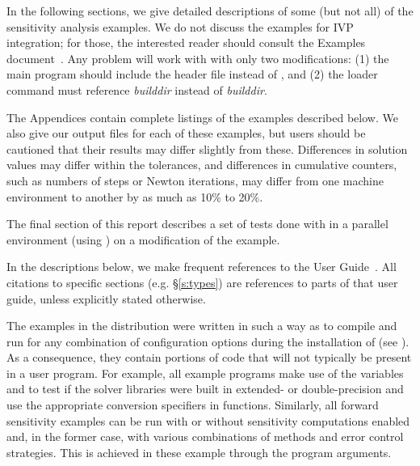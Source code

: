 In the following sections, we give detailed descriptions of some (but
not all) of the sensitivity analysis examples. We do not discuss the 
examples for IVP integration; for those, the interested reader should consult
the {\cvode} Examples document~\cite{cvode2.4.0_ex}. Any {\cvode} problem
will work with {\cvodes} with only two modifications: (1) the main program
should include the header file  instead of , and
(2) the loader command must reference
{\em builddir} instead of
{\em builddir}.

The Appendices contain complete listings
of the examples described below.  We also give our output files for
each of these examples, but users should be cautioned that their
results may differ slightly from these.  Differences in solution
values may differ within the tolerances, and differences in cumulative
counters, such as numbers of steps or Newton iterations, may differ
from one machine environment to another by as much as 10\% to 20\%.

The final section of this report describes a set of tests done with
{\cvodes} in a parallel environment (using {\nvecp}) on a modification of
the  example.

In the descriptions below, we make frequent references to the {\cvodes}
User Guide~\cite{cvodes2.3.0_ug}.  All citations to specific sections
(e.g. \S\ref{s:types}) are references to parts of that user guide, unless
explicitly stated otherwise.

\vspace{0.2in}
The examples in the {\cvodes} distribution were written in such a way as
to compile and run for any combination of configuration options during
the installation of {\sundials} (see ). As a consequence,
they contain portions of code that will not typically be present in a
user program. For example, all example programs make use of the
variables  and 
to test if the solver libraries
were built in extended- or double-precision and use the appropriate conversion 
specifiers in  functions. Similarly, all forward sensitivity
examples can be run with or without sensitivity computations enabled and,
in the former case, with various combinations of methods and error control 
strategies. This is achieved in these example through the program arguments.

